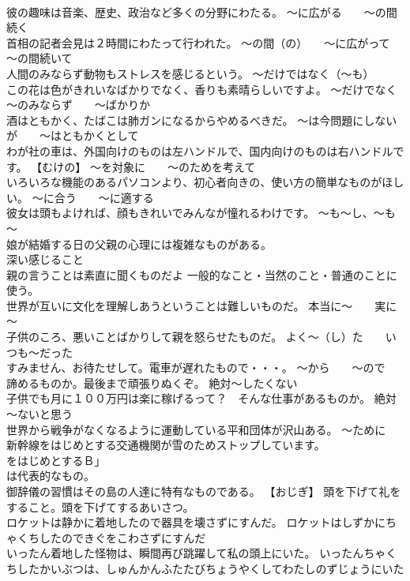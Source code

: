 \documentclass[8pt]{extreport}
\begin{document}
\begin{CJK}{UTF8}{min}
\\	彼の趣味は音楽、歴史、政治など多くの分野にわたる。	～に広がる　　～の間続く
\\	首相の記者会見は２時間にわたって行われた。	～の間（の）　　～に広がって　　～の間続いて
\\	人間のみならず動物もストレスを感じるという。	～だけではなく（～も）
\\	この花は色がきれいなばかりでなく、香りも素晴らしいですよ。	～だけでなく　　～のみならず　　～ばかりか
\\	酒はともかく、たばこは肺ガンになるからやめるべきだ。	～は今問題にしないが　　～はともかくとして
\\	わが社の車は、外国向けのものは左ハンドルで、国内向けのものは右ハンドルです。	【むけの】 ～を対象に　　～のためを考えて
\\	いろいろな機能のあるパソコンより、初心者向きの、使い方の簡単なものがほしい。	～に合う　　～に適する
\\	彼女は頭もよければ、顔もきれいでみんなが憧れるわけです。	～も～し、～も～
\\	娘が結婚する日の父親の心理には複雑なものがある。	
\\	深い感じること
\\	親の言うことは素直に聞くものだよ	一般的なこと・当然のこと・普通のことに使う。
\\	世界が互いに文化を理解しあうということは難しいものだ。	本当に～　　実に～
\\	子供のころ、悪いことばかりして親を怒らせたものだ。	よく～（し）た　　いつも～だった
\\	すみません、お待たせして。電車が遅れたもので・・・。	～から　　～ので
\\	諦めるものか。最後まで頑張りぬくぞ。	絶対～したくない
\\	子供でも月に１００万円は楽に稼げるって？　そんな仕事があるものか。	絶対～ないと思う
\\	世界から戦争がなくなるように運動している平和団体が沢山ある。	～ために
\\	新幹線をはじめとする交通機関が雪のためストップしています。	
\\	をはじめとするＢ」　　
\\	は代表的なもの。
\\	御辞儀の習慣はその島の人達に特有なものである。	【おじぎ】 頭を下げて礼をすること。頭を下げてするあいさつ。
\\	ロケットは静かに着地したので器具を壊さずにすんだ。	ロケットはしずかにちゃくちしたのできぐをこわさずにすんだ 
\\	いったん着地した怪物は、瞬間再び跳躍して私の頭上にいた。	いったんちゃくちしたかいぶつは、しゅんかんふたたびちょうやくしてわたしのずじょうにいた 

\end{CJK}
\end{document}
